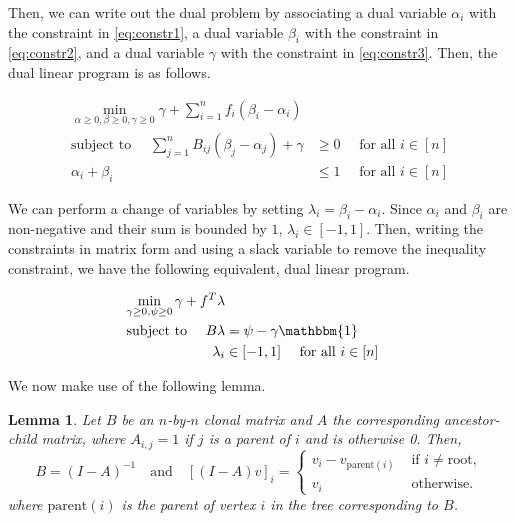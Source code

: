 \documentclass[11pt]{article}
\newtheorem{lemma}{Lemma}
\begin{document}
Then, we can write out the dual problem by associating
a dual variable $\alpha_i$ with the constraint in \eqref{eq:constr1},
a dual variable $\beta_i$ with the constraint in \eqref{eq:constr2},
and a dual variable $\gamma$ with the constraint in \eqref{eq:constr3}.
Then, the dual linear program is as follows.

\begin{mdframed}
  \begin{align}
    \min_{\alpha \geq 0, \beta \geq 0, \gamma \geq 0} \gamma + \sum_{i=1}^n f_i(\beta_i - \alpha_i) \nonumber \\
    \text{subject to } \quad 
    \sum_{j=1}^n B_{ij}(\beta_j - \alpha_j) + \gamma &\geq 0 \quad\text{ for all } i \in [n] \label{eq:dualconstr0} \\
    \alpha_i + \beta_i &\leq 1 \quad\text{ for all } i \in [n] \label{eq:dualconstr1}
  \end{align}
\end{mdframed}

We can perform a change of variables by setting $\lambda_i = \beta_i - \alpha_i$.
Since $\alpha_i$ and $\beta_i$ are non-negative and their sum is bounded by $1$, 
$\lambda_i \in [-1, 1]$. Then, writing the constraints in matrix form and 
using a slack variable to remove the inequality constraint, we have
the following equivalent, dual linear program.

\begin{mdframed}
  \begin{align}
    \min_{\gamma \geq 0, \psi \geq 0} \gamma + f^T\lambda \\
    \text{subject to } \quad 
    B\lambda &= \psi - \gamma\mathbbm{1} \label{eq:dualconstr0} \\
    \lambda_i &\in [-1, 1] \quad\text{ for all } i \in [n]
  \end{align}
\end{mdframed}

We now make use of the following lemma.

\begin{lemma}
  \label{thm:main}
  Let $B$ be an $n$-by-$n$ clonal matrix and $A$ the corresponding ancestor-child matrix,
  where $A_{i,j} = 1$ if $j$ is a parent of $i$ and is otherwise 0. Then, 
  $$B = (I - A)^{-1} \quad\text{and}\quad [(I - A)v]_i = \begin{cases}
    v_i - v_{\text{parent}(i)} &\text{ if } i \neq \text{root}, \\
    v_i &\text{ otherwise}.
  \end{cases}$$
  where $\text{parent}(i)$ is the parent of vertex $i$ in the tree corresponding to $B$.
\end{lemma}
\end{document}
